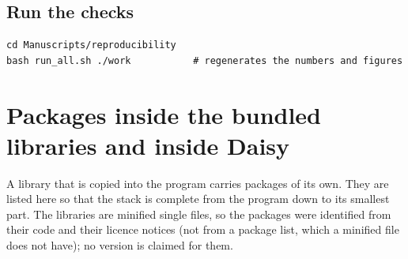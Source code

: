 \subsection{Run the checks}
\begin{verbatim}
cd Manuscripts/reproducibility
bash run_all.sh ./work           # regenerates the numbers and figures
\end{verbatim}

\section{Packages inside the bundled libraries and inside Daisy}
A library that is copied into the program carries packages of its own. They are listed here so that the stack is complete from the program down to its smallest part. The libraries are minified single files, so the packages were identified from their code and their licence notices (not from a package list, which a minified file does not have); no version is claimed for them.
